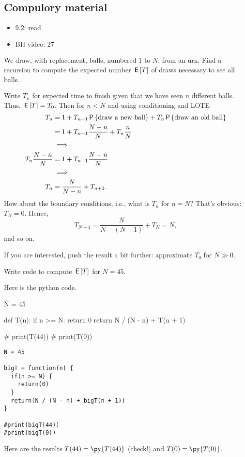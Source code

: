 \subsection{Compulory material}
\label{sec:compulory-material}

\begin{itemize}
\item 9.2: read
\item BH video: 27
\end{itemize}


\begin{exercise}
We draw, with replacement, balls, numbered 1 to $N$, from an urn.
Find a recursion to compute the expected number $\E T$ of draws necessary to see all balls.
\begin{solution}
Write $T_{n}$ for expected time to finish given that we have seen $n$ different balls. Thus, $\E T = T_{0}$.
Then for $n< N$ and using conditioning and LOTE
\begin{align}
T_n
&= 1
+T_{n+1} \P{\text{draw a new ball}}
+T_{n} \P{\text{draw an old ball}}  \\
&= 1
+T_{n+1} \frac{N-n}{N}
+T_{n} \frac{n}{N} \\
&\implies\\
T_n \frac{N-n}{N} &= 1 +T_{n+1} \frac{N-n}{N} \\
&\implies \\
T_n &= \frac{N}{N-n}  +T_{n+1}.
\end{align}
How about the boundary conditions, i.e., what is $T_{n}$ for $n=N$?
That's obvious: $T_{N} = 0$. Hence,
\begin{equation}
T_{N-1} = \frac{N}{N-(N-1)} + T_{N} = N,
\end{equation}
and so on.

If you are interested,  push the result a bit further: approximate $T_{0}$ for $N\gg 0$.
\end{solution}
\end{exercise}


\begin{exercise}
Write code to compute $\E T$ for $N=45$.
\begin{solution}
Here is the python code.

\begin{pyblock}
N = 45


def T(n):
    if n >= N:
        return 0
    return N / (N - n) + T(n + 1)

# print(T(44))
# print(T(0))
\end{pyblock}
\begin{verbatim}
N = 45

bigT = function(n) {
  if(n >= N) {
    return(0)
  }
  return(N / (N - n) + bigT(n + 1))
}

#print(bigT(44))
#print(bigT(0))
\end{verbatim}
Here are the results $T(44) = \py{T(44)}$ (check!) and $T(0) = \py{T(0)}$.
\end{solution}
\end{exercise}

